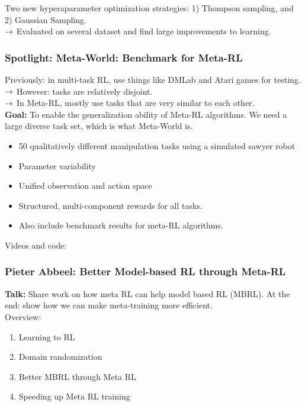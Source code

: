 Two new hyperaparameter optimization strategies: 1) Thompson sampling, and 2) Gaussian Sampling. \\

$\rightarrow$ Evaluated on several dataset and find large improvements to learning.

\subsubsection{Spotlight: Meta-World: Benchmark for Meta-RL}

Previously: in multi-task RL, use things like DMLab and Atari games for testing. \\

$\rightarrow$ However: tasks are relatively disjoint. \\

$\rightarrow$ In Meta-RL, mostly use tasks that are very similar to each other. \\

{\bf Goal:} To enable the generalization ability of Meta-RL algorithms. We need a large diverse task set, which is what Meta-World is.
\begin{itemize}
    \item 50 qualitatively different manipulation tasks using a simulated sawyer robot
    \item Parameter variability
    \item Unified observation and action space
    \item Structured, multi-component rewards for all tasks.
    \item Also include benchmark results for meta-RL algorithms.
\end{itemize}

Videos and code: 

\subsubsection{Pieter Abbeel: Better Model-based RL through Meta-RL}

{\bf Talk:} Share work on how meta RL can help model based RL (MBRL). At the end: show how we can make meta-training more efficient.\\

Overview:
\begin{enumerate}
    \item Learning to RL
    \item Domain randomization
    \item Better MBRL through Meta RL
    \item Speeding up Meta RL training
\end{enumerate}

